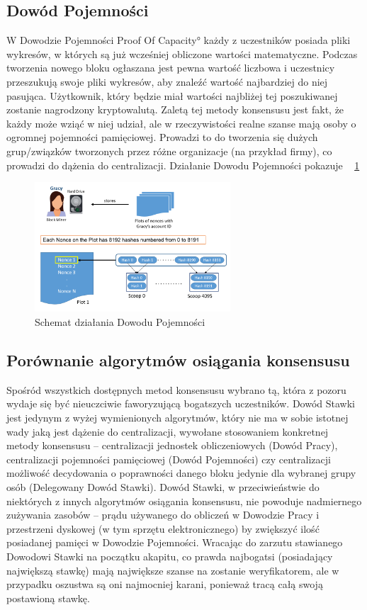 \subsection{Dowód Pojemności}
\label{ssec:PoC}
W Dowodzie Pojemności \ang{Proof Of Capacity} każdy z uczestników posiada pliki wykresów, w których są już wcześniej obliczone wartości matematyczne. Podczas tworzenia nowego bloku ogłaszana jest pewna wartość liczbowa i uczestnicy przeszukują swoje pliki wykresów, aby znaleźć wartość najbardziej do niej pasująca. Użytkownik, który będzie miał wartości najbliżej tej poszukiwanej zostanie nagrodzony kryptowalutą. Zaletą tej metody konsensusu jest fakt, że każdy może wziąć w niej udział, ale w rzeczywistości realne szanse mają osoby o ogromnej pojemności pamięciowej. Prowadzi to do tworzenia się dużych grup/związków tworzonych przez różne organizacje (na przykład firmy), co prowadzi do dążenia do centralizacji. Działanie Dowodu Pojemności pokazuje \figurename{~ \ref{fig:ConsensusPOC}}
\begin{figure}[hb]
    \centering
    \includegraphics[width=0.65\textwidth]{Images/ConsensusPOC.png}
    \caption{Schemat działania Dowodu Pojemności}
    \label{fig:ConsensusPOC}
\end{figure}

\subsection{Porównanie algorytmów osiągania konsensusu}
\label{ssec:KonsensusPorownanie}
Spośród wszystkich dostępnych metod konsensusu wybrano tą, która z pozoru wydaje się być nieuczciwie faworyzującą bogatszych uczestników. Dowód Stawki jest jedynym z wyżej wymienionych algorytmów, który nie ma w sobie istotnej wady jaką jest dążenie do centralizacji, wywołane stosowaniem konkretnej metody konsensusu – centralizacji jednostek obliczeniowych (Dowód Pracy), centralizacji pojemności pamięciowej (Dowód Pojemności) czy centralizacji możliwość decydowania o poprawności danego bloku jedynie dla wybranej grupy osób (Delegowany Dowód Stawki). Dowód Stawki, w przeciwieństwie do niektórych z innych algorytmów osiągania konsensusu, nie powoduje nadmiernego zużywania zasobów – prądu używanego do obliczeń w Dowodzie Pracy i przestrzeni dyskowej (w tym sprzętu elektronicznego) by zwiększyć ilość posiadanej pamięci w Dowodzie Pojemności. Wracając do zarzutu stawianego Dowodowi Stawki na początku akapitu, co prawda najbogatsi (posiadający największą stawkę) mają największe szanse na zostanie weryfikatorem, ale w przypadku oszustwa są oni najmocniej karani, ponieważ tracą całą swoją postawioną stawkę.

